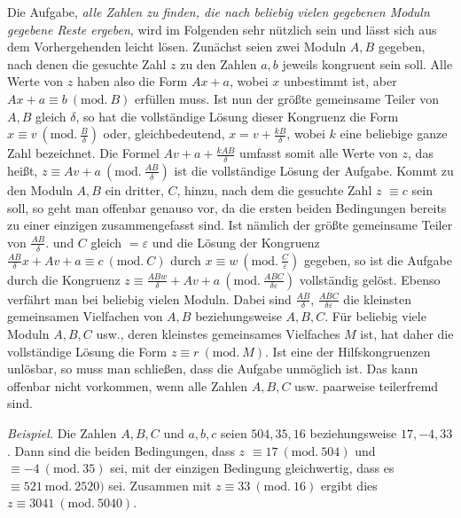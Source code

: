 Die Aufgabe, \emph{alle Zahlen zu finden, die nach beliebig vielen gegebenen Moduln gegebene Reste ergeben}, wird im Folgenden sehr nützlich sein und lässt sich aus dem Vorhergehenden leicht lösen. Zunächst seien zwei Moduln $A,B$ gegeben, nach denen die gesuchte Zahl
$z$ zu den Zahlen $a,b$ jeweils kongruent sein soll. Alle Werte von $z$ haben also die Form $Ax+a$, wobei $x$ unbestimmt ist, aber $Ax+a\equiv b\ (\mathrm{mod.}\ B)$ erfüllen muss. Ist nun der größte gemeinsame Teiler von $A,B$ gleich $\delta$, so hat die vollständige Lösung dieser Kongruenz die Form $x\equiv v\ (\mathrm{mod.}\ \frac{B}{\delta})$ oder, gleichbedeutend, $x=v+\frac{kB}{\delta}$, wobei $k$ eine beliebige ganze Zahl bezeichnet. Die Formel $Av+a+\frac{kAB}{\delta}$ umfasst somit alle Werte von $z$, das heißt, $z\equiv Av+a\ (\mathrm{mod.}\ \frac{AB}{\delta})$ ist die vollständige Lösung der Aufgabe. Kommt zu den Moduln $A,B$ ein dritter, $C$, hinzu, nach dem die gesuchte Zahl $z$ $\equiv c$ sein soll, so geht man offenbar genauso vor, da die ersten beiden Bedingungen bereits zu einer einzigen zusammengefasst sind. Ist nämlich der größte gemeinsame Teiler von $\frac{AB}{\delta}.$ und $C$ gleich $=\varepsilon$ und die Lösung der Kongruenz $\frac{AB}{\delta}x+Av+a\equiv c\ (\mathrm{mod.}\ C)$ durch $x\equiv w\ (\mathrm{mod.}\ \frac{C}{\varepsilon})$ gegeben, so ist die Aufgabe durch die Kongruenz $z\equiv\frac{ABw}{\delta}+Av+a\ (\mathrm{mod.}\ \frac{ABC}{\delta\varepsilon})$ vollständig gelöst. Ebenso verfährt man bei beliebig vielen Moduln. Dabei sind $\frac{AB}{\delta}$, $\frac{ABC}{\delta\varepsilon}$ die kleinsten gemeinsamen Vielfachen von $A,B$ beziehungsweise $A,B,C$. Für beliebig viele Moduln $A,B,C$ usw., deren kleinstes gemeinsames Vielfaches $M$ ist, hat daher die vollständige Lösung die Form $z\equiv r\ (\mathrm{mod.}\ M)$. Ist eine der Hilfskongruenzen unlösbar, so muss man schließen, dass die Aufgabe unmöglich ist. Das kann offenbar nicht vorkommen, wenn alle Zahlen $A,B,C$ usw. paarweise teilerfremd sind.

\emph{Beispiel.} Die Zahlen $A,B,C$ und $a,b,c$ seien $504,35,16$ beziehungsweise $17,-4,33$. Dann sind die beiden Bedingungen, dass $z$ $\equiv 17\ (\mathrm{mod.}\ 504)$ und $\equiv -4\ (\mathrm{mod.}\ 35)$ sei, mit der einzigen Bedingung gleichwertig, dass es $\equiv 521\ \mathrm{mod.}\ 2520)$ sei. Zusammen mit $z\equiv 33\ (\mathrm{mod.}\ 16)$ ergibt dies $z\equiv 3041\ (\mathrm{mod.}\ 5040)$.


